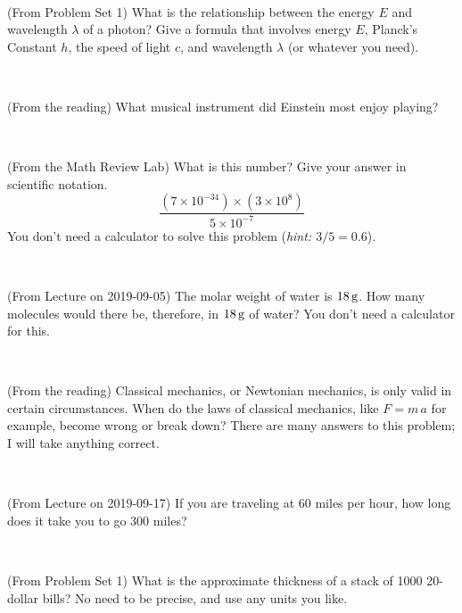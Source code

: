 \documentclass[12pt, letterpaper]{article}
\begin{document}
\vfill ~

\begin{problem} (From Problem Set 1)
What is the relationship between the energy $E$ and wavelength
$\lambda$ of a photon? Give a formula that involves energy $E$,
Planck's Constant $h$, the speed of light $c$, and wavelength
$\lambda$ (or whatever you need).
\end{problem}

\vfill ~

\begin{problem} (From the reading)
What musical instrument did Einstein most enjoy playing?
\end{problem}


\vfill ~

\begin{problem} (From the Math Review Lab)
What is this number? Give your answer in scientific notation.
$$
\frac{(7\times10^{-34})\times(3\times10^8)}{5\times10^{-7}}
$$
You don't need a calculator to solve this problem (\textit{hint: $3/5=0.6$}).
\end{problem}


\vfill ~


\clearpage


\begin{problem} (From Lecture on 2019-09-05)
The molar weight of water is $18\,\mathrm{g}$. How many molecules would there
be, therefore, in $18\,\mathrm{g}$ of water? You don't need a calculator for
this.
\end{problem}


\vfill ~

\begin{problem} (From the reading)
Classical mechanics, or Newtonian mechanics, is only valid in certain
circumstances. When do the laws of classical mechanics, like $F =
m\,a$ for example, become wrong or break down? There are many answers
to this problem; I will take anything correct.
\end{problem}


\vfill ~

\begin{problem} (From Lecture on 2019-09-17)
If you are traveling at 60 miles per hour, how long does
it take you to go 300 miles?
\end{problem}


\vfill ~

\begin{problem} (From Problem Set 1)
What is the approximate thickness of a stack of 1000 20-dollar bills?
No need to be precise, and use any units you like.
\end{problem}
\end{document}
